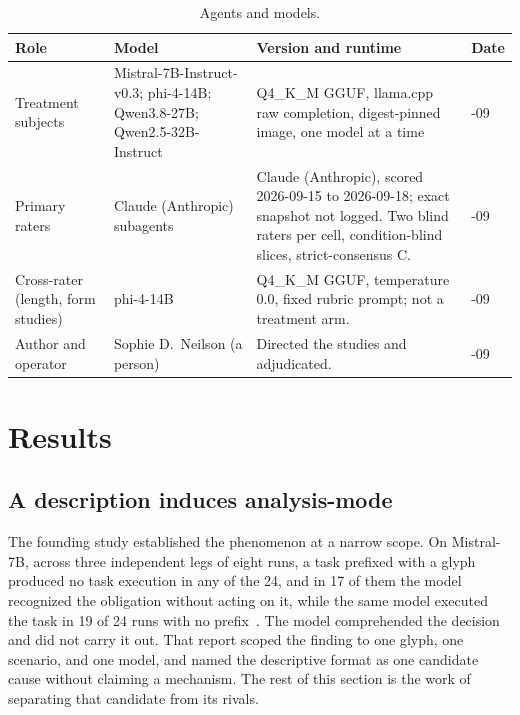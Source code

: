 \documentclass[11pt,a4paper]{article}
\begin{document}
\begin{table}[h]
\centering
\small
\caption{Agents and models.}
\label{tab:agents}
\begin{tabular}{@{}>{\raggedright\arraybackslash}p{3.1cm}>{\raggedright\arraybackslash}p{3.4cm}>{\raggedright\arraybackslash}p{4.8cm}>{\raggedright\arraybackslash}p{2.4cm}@{}}
\toprule
Role & Model & Version and runtime & Date \\
\midrule
Treatment subjects & Mistral-7B-Instruct-v0.3; phi-4-14B; Qwen3.8-27B; Qwen2.5-32B-Instruct & Q4\_K\_M GGUF, llama.cpp raw completion, digest-pinned image, one model at a time & 2026-09 \\
Primary raters & Claude (Anthropic) subagents & Claude (Anthropic), scored 2026-09-15 to 2026-09-18; exact snapshot not logged. Two blind raters per cell, condition-blind slices, strict-consensus C. & 2026-09 \\
Cross-rater (length, form studies) & phi-4-14B & Q4\_K\_M GGUF, temperature 0.0, fixed rubric prompt; not a treatment arm. & 2026-09 \\
Author and operator & Sophie D.\ Neilson (a person) & Directed the studies and adjudicated. & 2026-09 \\
\bottomrule
\end{tabular}
\end{table}

\section{Results}

\subsection{A description induces analysis-mode}\label{sec:phenomenon}

The founding study established the phenomenon at a narrow scope. On Mistral-7B, across
three independent legs of eight runs, a task prefixed with a glyph produced no task
execution in any of the 24, and in 17 of them the model recognized the obligation without
acting on it, while the same model executed the task in 19 of 24 runs with no
prefix~\citep{neilson2026q2}. The model comprehended the decision and did not carry it
out. That report scoped the finding
to one glyph, one scenario, and one model, and named the descriptive format as one
candidate cause without claiming a mechanism. The rest of this section is the work of
separating that candidate from its rivals.
\end{document}
